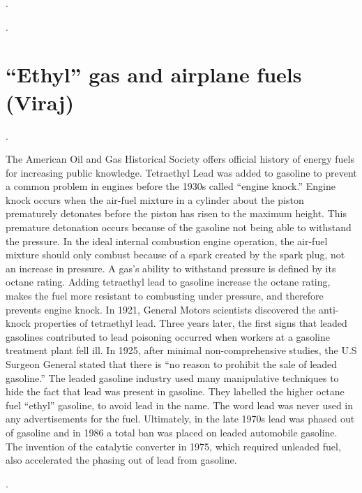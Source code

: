 \documentclass{article}
\begin{document}
. 

\medskip

.

\medskip

\section{``Ethyl'' gas and airplane fuels (Viraj)}

\bigskip

\noindent {}.
\medskip

The American Oil and Gas Historical Society offers official history of energy fuels for increasing public knowledge. Tetraethyl Lead was added to gasoline to prevent a common problem in engines before the 1930s called “engine knock.” Engine knock occurs when the air-fuel mixture in a cylinder about the piston prematurely detonates before the piston has risen to the maximum height. This premature detonation occurs because of the gasoline not being able to withstand the pressure. In the ideal internal combustion engine operation, the air-fuel mixture should only combust because of a spark created by the spark plug, not an increase in pressure. A gas’s ability to withstand pressure is defined by its octane rating. Adding tetraethyl lead to gasoline increase the octane rating, makes the fuel more resistant to combusting under pressure, and therefore prevents engine knock. In 1921, General Motors scientists discovered the anti-knock properties of tetraethyl lead. Three years later, the first signs that leaded gasolines contributed to lead poisoning occurred when workers at a gasoline treatment plant fell ill. In 1925, after minimal non-comprehensive studies, the U.S Surgeon General stated that there is “no reason to prohibit the sale of leaded gasoline.” The leaded gasoline industry used many manipulative techniques to hide the fact that lead was present in gasoline. They labelled the higher octane fuel “ethyl” gasoline, to avoid lead in the name. The word lead was never used in any advertisements for the fuel. Ultimately, in the late 1970s lead was phased out of gasoline and in 1986 a total ban was placed on leaded automobile gasoline. The invention of the catalytic converter in 1975, which required unleaded fuel, also accelerated the phasing out of lead from gasoline. 

\bigskip
\noindent {} .
\end{document}
